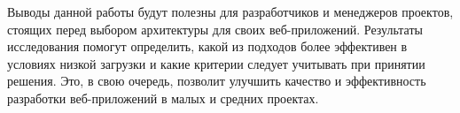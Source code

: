Выводы данной работы будут полезны для разработчиков и менеджеров проектов, стоящих перед выбором архитектуры для своих веб-приложений. Результаты исследования помогут определить, какой из подходов более эффективен в условиях низкой загрузки и какие критерии следует учитывать при принятии решения. Это, в свою очередь, позволит улучшить качество и эффективность разработки веб-приложений в малых и средних проектах.

\clearpage